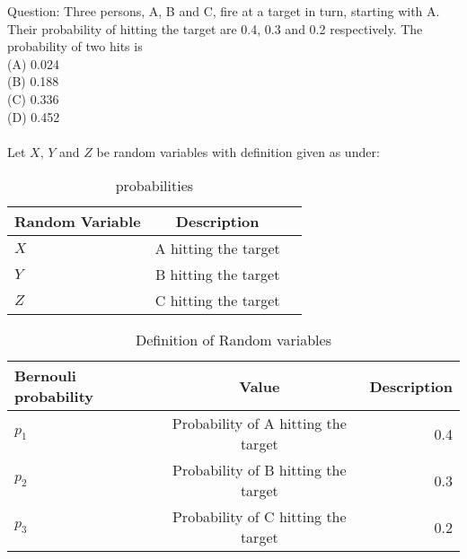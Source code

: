 \documentclass[journal,12pt,onecolumn]{IEEEtran}
\theoremstyle{remark}
\begin{document}
\let\vec\mathbf




\vspace{3cm}



\bigskip

\renewcommand{\thefigure}{\theenumi}
\renewcommand{\thetable}{\theenumi}
Question: Three persons, A, B and C, fire at a target in turn, starting with A. Their probability of hitting the target are 0.4, 0.3 and 0.2 respectively. The probability of two hits is\\
(A) 0.024\\
(B) 0.188\\
(C) 0.336\\
(D) 0.452\\
\solution \\
\fi
Let $X$, $Y$ and $Z$ be random variables with definition given as under:
\begin{table}[h]
\centering
\begin{tabular}{|l|c|r|}
\hline
    Random Variable &  Description\\
    \hline
    $X$ & A hitting the target \\
    \hline
    $Y$ &  B hitting the target \\
    \hline
    $Z$ &  C hitting the target\\
    \hline
\end{tabular}
\caption{probabilities}
\end{table}
\begin{table}[h]
\centering
\begin{tabular}{|l|c|r|}
\hline
    Bernouli probability & Value & Description\\
    \hline
    $p_1$ & Probability of A hitting the target &0.4\\
    \hline
    $p_2$ &  Probability of B hitting the target&0.3 \\
    \hline
    $p_3$ &  Probability of C hitting the target&0.2\\
    \hline
\end{tabular}
\label{tab:ncert/12/13/3/76/}
\caption{Definition of Random variables}
\end{table}
\end{document}
